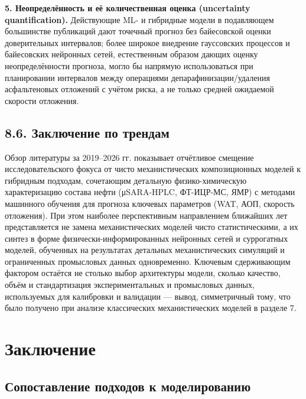 \documentclass[11pt]{extarticle}
\begin{document}
\textbf{5. Неопределённость и её количественная оценка (uncertainty quantification).} Действующие ML- и гибридные модели в подавляющем большинстве публикаций дают точечный прогноз без байесовской оценки доверительных интервалов; более широкое внедрение гауссовских процессов и байесовских нейронных сетей, естественным образом дающих оценку неопределённости прогноза, могло бы напрямую использоваться при планировании интервалов между операциями депарафинизации/удаления асфальтеновых отложений с учётом риска, а не только средней ожидаемой скорости отложения.

\subsection{8.6. Заключение по трендам}\label{ux437ux430ux43aux43bux44eux447ux435ux43dux438ux435-ux43fux43e-ux442ux440ux435ux43dux434ux430ux43c}

Обзор литературы за 2019--2026 гг. показывает отчётливое смещение исследовательского фокуса от чисто механистических композиционных моделей к гибридным подходам, сочетающим детальную физико-химическую характеризацию состава нефти (μSARA-HPLC, ФТ-ИЦР-МС, ЯМР) с методами машинного обучения для прогноза ключевых параметров (WAT, АОП, скорость отложения). При этом наиболее перспективным направлением ближайших лет представляется не замена механистических моделей чисто статистическими, а их синтез в форме физически-информированных нейронных сетей и суррогатных моделей, обученных на результатах детальных механистических симуляций и ограниченных промысловых данных одновременно. Ключевым сдерживающим фактором остаётся не столько выбор архитектуры модели, сколько качество, объём и стандартизация экспериментальных и промысловых данных, используемых для калибровки и валидации --- вывод, симметричный тому, что было получено при анализе классических механистических моделей в разделе 7.

\newpage

\section{Заключение}\label{ux437ux430ux43aux43bux44eux447ux435ux43dux438ux435}

\subsection{Сопоставление подходов к моделированию}\label{ux441ux43eux43fux43eux441ux442ux430ux432ux43bux435ux43dux438ux435-ux43fux43eux434ux445ux43eux434ux43eux432-ux43a-ux43cux43eux434ux435ux43bux438ux440ux43eux432ux430ux43dux438ux44e}
\end{document}

